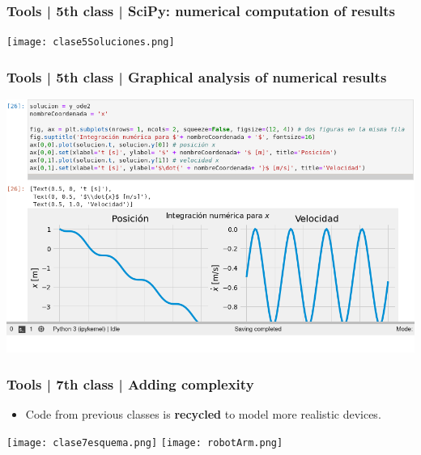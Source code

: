 \documentclass[aspectratio=169]{beamer}
\begin{document}
\begin{frame}
	\frametitle{Tools | 5th class | SciPy: numerical computation of results}
	\begin{block}{}
	\texttt{[image: clase5Soluciones.png]}
	\end{block}
\end{frame}


\begin{frame}
	\frametitle{Tools | 5th class | Graphical analysis of numerical results}
	\begin{block}{}
	\includegraphics[width= \textwidth]{clase5Representación}
	\end{block}
\end{frame}

\begin{frame}
	\frametitle{Tools | 7th class | Adding complexity}
	\begin{block}{}
		\begin{itemize}
			\item Code from previous classes is \textbf{recycled} to model more realistic devices.
		\end{itemize}
	\texttt{[image: clase7esquema.png]}
	\texttt{[image: robotArm.png]}
	\end{block}
\end{frame}
\end{document}

